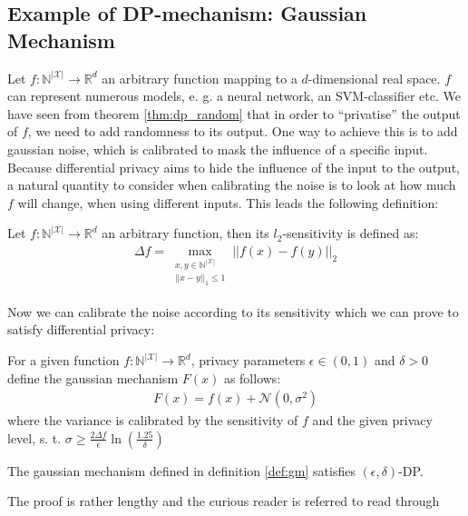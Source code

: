 \subsection{Example of DP-mechanism: Gaussian Mechanism}

Let $f:\mathbb{N}^{|\mathcal{X}|} \longrightarrow \mathbb{R}^d$ an arbitrary function mapping to a $d$-dimensional real space. $f$ can represent numerous models, e. g. a neural network, an SVM-classifier etc. We have seen from theorem \ref*{thm:dp_random} that in order to ``privatise'' the output of $f$, we need to add randomness to its output. One way to achieve this is to add gaussian noise, which is calibrated to mask the influence of a specific input. Because differential privacy aims to hide the influence of the input to the output, a natural quantity to consider when calibrating the noise is to look at how much $f$ will change, when using different inputs. This leads the following definition:

\begin{definition}[$l_2$-sensitivity]
    Let $f:\mathbb{N}^{|\mathcal{X}|} \longrightarrow \mathbb{R}^d$ an arbitrary function, then its $l_2$-sensitivity is defined as:
    \begin{align}
        \Delta f = \max_{\substack{x,y \in \mathbb{N}^{|\mathcal{X}|} \\ ||x-y||_1\le 1}} ||f(x)-f(y)||_2 
    \end{align}
\end{definition}

Now we can calibrate the noise according to its sensitivity which we can prove to satisfy differential privacy:
\begin{definition}\label{def:gm} \label{def:gm}
    For a given function  $f:\mathbb{N}^{|\mathcal{X}|} \longrightarrow \mathbb{R}^d$, privacy parameters $\epsilon \in (0,1)$ and $\delta>0$ define the gaussian mechanism $F(x)$ as follows:
    \begin{align}
        F(x) = f(x) + \mathcal{N}(0, \sigma^2)
    \end{align}
    where the variance is calibrated by the sensitivity of $f$ and the given privacy level, s. t. $\sigma \ge \frac{2 \Delta f}{\epsilon}\ln(\frac{1.25}{\delta})$
\end{definition}

\begin{thm}
    The gaussian mechanism defined in definition \ref{def:gm} satisfies $(\epsilon, \delta)$-DP.
\end{thm}
The proof is rather lengthy and the curious reader is referred to read through \parencite[][Appendix A]{dwork2014algorithmic}